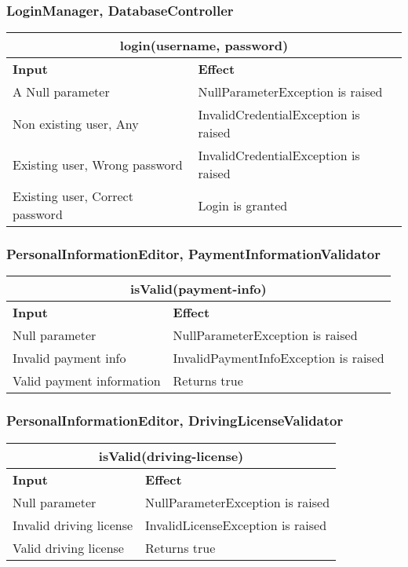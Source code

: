 \subsubsection{LoginManager, DatabaseController}
\begin{tabular}{|p{5cm}|p{7cm}|}
\hline
\multicolumn{2}{|c|}{login(username, password)} \\
\hline
\textbf{Input} & \textbf{Effect} \\

\hline
A Null parameter & NullParameterException is raised \\

\hline
Non existing user, Any & InvalidCredentialException is raised \\

\hline
Existing user, Wrong password & InvalidCredentialException is raised \\

\hline
Existing user, Correct password & Login is granted \\
\hline
\end{tabular}


\subsubsection{PersonalInformationEditor, PaymentInformationValidator}
\begin{tabular}{|p{5cm}|p{7cm}|}
\hline
\multicolumn{2}{|c|}{isValid(payment-info)} \\
\hline
\textbf{Input} & \textbf{Effect} \\

\hline
Null parameter & NullParameterException is raised \\

\hline
Invalid payment info & InvalidPaymentInfoException is raised \\

\hline
Valid payment information & Returns true \\
\hline
\end{tabular}

\subsubsection{PersonalInformationEditor, DrivingLicenseValidator}
\begin{tabular}{|p{5cm}|p{7cm}|}
\hline
\multicolumn{2}{|c|}{isValid(driving-license)} \\
\hline
\textbf{Input} & \textbf{Effect} \\

\hline
Null parameter & NullParameterException is raised \\

\hline
Invalid driving license & InvalidLicenseException is raised \\

\hline
Valid driving license & Returns true \\
\hline
\end{tabular}

